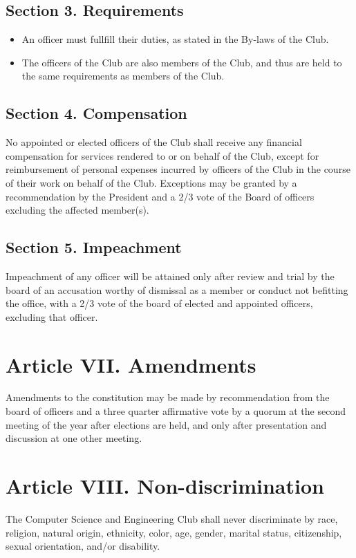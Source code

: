 \documentclass{article}
\begin{document}
  \subsection{Section 3. Requirements}
    \begin{itemize}
      \item An officer must fullfill their duties, as stated in the By-laws of the Club.
      \item The officers of the Club are also members of the Club, and thus are held to the same requirements as members of the Club.
    \end{itemize}

  \subsection{Section 4. Compensation}
    No appointed or elected officers of the Club shall receive any financial compensation for services rendered to or on behalf of the Club, except for reimbursement of personal expenses incurred by officers of the Club in the course of their work on behalf of the Club. Exceptions may be granted by a recommendation by the President and a 2/3 vote of the Board of officers excluding the affected member(s).

  \subsection{Section 5. Impeachment}
    Impeachment of any officer will be attained only after review and trial by the board of an accusation worthy of dismissal as a member or conduct not befitting the office, with a 2/3 vote of the board of elected and appointed officers, excluding that officer.

\section{Article VII. Amendments}
  Amendments to the constitution may be made by recommendation from the board of officers and a three quarter affirmative vote by a quorum at the second meeting of the year after elections are held, and only after presentation and discussion at one other meeting.

\section{Article VIII. Non-discrimination}
  The Computer Science and Engineering Club shall never discriminate by race, religion, natural origin, ethnicity, color, age, gender, marital status, citizenship, sexual orientation, and/or disability.
\end{document}
